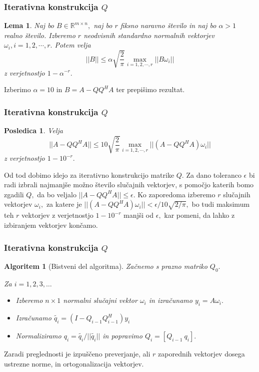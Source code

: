 \documentclass{beamer}
\newtheorem{posledica}{Posledica}
\newtheorem{lema}{Lema}
\newtheorem{algoritem}{Algoritem}
\begin{document}
\begin{frame}
\frametitle{Iterativna konstrukcija $Q$}

\begin{lema}
Naj bo $B\in \mathbb{R}^{m \times n},$ naj bo $r$ fiksno naravno število in naj bo $\alpha > 1$ realno število. Izberemo $r$ neodvisnih standardno normalnih vektorjev $\omega_i, i = 1, 2, \cdots, r.$ Potem velja $$||B|| \leq \alpha \sqrt{\frac{2}{\pi}} \max_{i = 1, 2, \cdots, r} ||B\omega_i||$$ z verjetnostjo $1- \alpha^{-r}.$
\end{lema}

Izberimo $\alpha = 10$ in $B = A - QQ^HA$ ter prepišimo rezultat.

\end{frame}


\begin{frame}
\frametitle{Iterativna konstrukcija $Q$}

\begin{posledica}
Velja $$||A - QQ^HA|| \leq 10 \sqrt{\frac{2}{\pi}} \max_{i = 1, 2, \cdots, r} ||(A - QQ^HA)\omega_i||$$ z verjetnostjo $1-10^{-r}.$
\end{posledica}

Od tod dobimo idejo za iterativno konstrukcijo matrike $Q.$ Za dano toleranco $\epsilon$ bi radi izbrali najmanjše možno število slučajnih vektorjev, s pomočjo katerih bomo zgadili $Q,$ da bo veljalo $||A - QQ^HA|| \leq \epsilon.$ Ko zaporedoma izberemo $r$ slučajnih vektorjev $\omega_i,$ za katere je $ ||(A - QQ^HA)\omega_i|| < \epsilon / 10\sqrt{2/\pi},$ bo tudi maksimum teh $r$ vektorjev  z verjetnostjo $1-10^{-r}$ manjši od $\epsilon,$ kar pomeni, da lahko z izbiranjem vektorjev končamo.
\end{frame}
\begin{frame}
\frametitle{Iterativna konstrukcija $Q$}

\begin{algoritem}[Bistveni del algoritma]
Začnemo s prazno matriko $Q_0.$

Za $i = 1, 2, 3, \ldots$
\begin{itemize}
\item Izberemo $n \times 1$ normalni slučajni vektor $\omega_i$ in izračunamo $y_i = A \omega_i.$
\item Izračunamo $\tilde{q_i} = (I - Q_{i-1}Q_{i-1}^H)y_i$
\item Normaliziramo $q_i =\tilde{q_i}/||\tilde{q_i}||$ in popravimo $Q_i = [Q_{i-1} \ q_i].$
\end{itemize}
\end{algoritem}

Zaradi preglednosti je izpuščeno preverjanje, ali $r$ zaporednih vektorjev dosega ustrezne norme, in ortogonalizacija vektorjev.

\end{frame}
\end{document}
